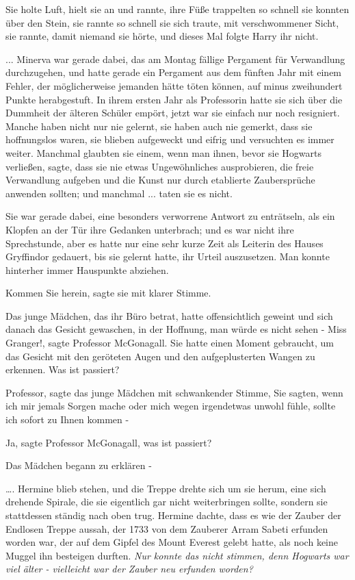 Sie holte Luft, hielt sie an und rannte, ihre Füße trappelten so schnell sie
konnten über den Stein, sie rannte so schnell sie sich traute, mit
verschwommener Sicht, sie rannte, damit niemand sie hörte, und dieses Mal folgte
Harry ihr nicht.

... Minerva war gerade dabei, das am Montag fällige Pergament für Verwandlung
durchzugehen, und hatte gerade ein Pergament aus dem fünften Jahr mit einem
Fehler, der möglicherweise jemanden hätte töten können, auf minus zweihundert
Punkte herabgestuft. In ihrem ersten Jahr als Professorin hatte sie sich über
die Dummheit der älteren Schüler empört, jetzt war sie einfach nur noch
resigniert. Manche haben nicht nur nie gelernt, sie haben auch nie gemerkt, dass
sie hoffnungslos waren, sie blieben aufgeweckt und eifrig und versuchten es
immer weiter. Manchmal glaubten sie einem, wenn man ihnen, bevor sie Hogwarts
verließen, sagte, dass sie nie etwas Ungewöhnliches ausprobieren, die freie
Verwandlung aufgeben und die Kunst nur durch etablierte Zaubersprüche anwenden
sollten; und manchmal ... taten sie es nicht.

Sie war gerade dabei, eine besonders verworrene Antwort zu enträtseln, als ein
Klopfen an der Tür ihre Gedanken unterbrach; und es war nicht ihre Sprechstunde,
aber es hatte nur eine sehr kurze Zeit als Leiterin des Hauses Gryffindor
gedauert, bis sie gelernt hatte, ihr Urteil auszusetzen. Man konnte hinterher
immer Hauspunkte abziehen.

\glqq{}Kommen Sie herein\grqq{}, sagte sie mit klarer Stimme.

Das junge Mädchen, das ihr Büro betrat, hatte offensichtlich geweint und sich
danach das Gesicht gewaschen, in der Hoffnung, man würde es nicht sehen - \glqq{}
Miss Granger!\grqq{}, sagte Professor McGonagall. Sie hatte einen Moment
gebraucht, um das Gesicht mit den geröteten Augen und den aufgeplusterten Wangen
zu erkennen. \glqq{}Was ist passiert?\grqq{}

\glqq{}Professor\grqq{}, sagte das junge Mädchen mit schwankender Stimme, \glqq{}
Sie sagten, wenn ich mir jemals Sorgen mache oder mich wegen irgendetwas unwohl
fühle, sollte ich sofort zu Ihnen kommen -\grqq{}

\glqq{}Ja\grqq{}, sagte Professor McGonagall, \glqq{}was ist passiert?\grqq{}

Das Mädchen begann zu erklären -

…. Hermine blieb stehen, und die Treppe drehte sich um sie herum, eine sich
drehende Spirale, die sie eigentlich gar nicht weiterbringen sollte, sondern sie
stattdessen ständig nach oben trug. Hermine dachte, dass es wie der Zauber der
Endlosen Treppe aussah, der 1733 von dem Zauberer Arram Sabeti erfunden worden
war, der auf dem Gipfel des Mount Everest gelebt hatte, als noch keine Muggel
ihn besteigen durften. \emph{Nur konnte das nicht stimmen, denn Hogwarts war
viel älter - vielleicht war der Zauber neu erfunden worden?}

